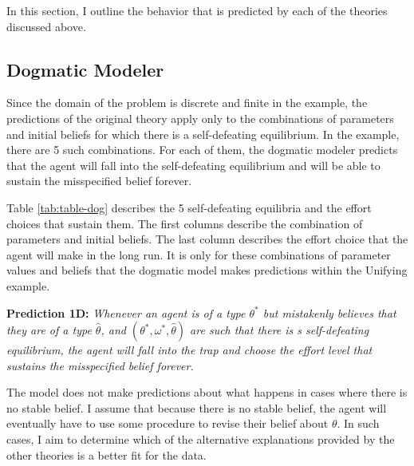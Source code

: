 \documentclass[
  12pt,
]{article}
\begin{document}
In this section, I outline the behavior that is predicted by each of the
theories discussed above.

\hypertarget{dogmatic-modeler}{%
\subsection{Dogmatic Modeler}\label{dogmatic-modeler}}

Since the domain of the problem is discrete and finite in the example,
the predictions of the original theory apply only to the combinations of
parameters and initial beliefs for which there is a self-defeating
equilibrium. In the example, there are 5 such combinations. For each of
them, the dogmatic modeler predicts that the agent will fall into the
self-defeating equilibrium and will be able to sustain the misspecified
belief forever.

Table \ref{tab:table-dog} describes the 5 self-defeating equilibria and
the effort choices that sustain them. The first columns describe the
combination of parameters and initial beliefs. The last column describes
the effort choice that the agent will make in the long run. It is only
for these combinations of parameter values and beliefs that the dogmatic
model makes predictions within the Unifying example.

\textbf{Prediction 1D:} \emph{Whenever an agent is of a type
\(\theta^*\) but mistakenly believes that they are of a type
\(\hat{\theta}\), and \((\theta^*, \omega^*, \hat{\theta})\) are such
that there is s self-defeating equilibrium, the agent will fall into the
trap and choose the effort level that sustains the misspecified belief
forever.}

The model does not make predictions about what happens in cases where
there is no stable belief. I assume that because there is no stable
belief, the agent will eventually have to use some procedure to revise
their belief about \(\theta\). In such cases, I aim to determine which
of the alternative explanations provided by the other theories is a
better fit for the data.
\end{document}
